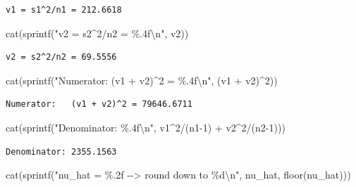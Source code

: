 \documentclass[
  letterpaper,
  DIV=11,
  numbers=noendperiod]{scrartcl}
\newenvironment{Shaded}{\begin{snugshade}}{\end{snugshade}}
\newcommand{\DecValTok}[1]{\textcolor[rgb]{0.68,0.00,0.00}{#1}}
\newcommand{\FunctionTok}[1]{\textcolor[rgb]{0.28,0.35,0.67}{#1}}
\newcommand{\NormalTok}[1]{\textcolor[rgb]{0.00,0.23,0.31}{#1}}
\newcommand{\SpecialCharTok}[1]{\textcolor[rgb]{0.37,0.37,0.37}{#1}}
\newcommand{\StringTok}[1]{\textcolor[rgb]{0.13,0.47,0.30}{#1}}
\begin{document}
\begin{verbatim}
v1 = s1^2/n1 = 212.6618
\end{verbatim}

\begin{Shaded}
\begin{Highlighting}[]
\FunctionTok{cat}\NormalTok{(}\FunctionTok{sprintf}\NormalTok{(}\StringTok{"v2 = s2\^{}2/n2 = \%.4f}\SpecialCharTok{\textbackslash{}n}\StringTok{"}\NormalTok{, v2))}
\end{Highlighting}
\end{Shaded}

\begin{verbatim}
v2 = s2^2/n2 = 69.5556
\end{verbatim}

\begin{Shaded}
\begin{Highlighting}[]
\FunctionTok{cat}\NormalTok{(}\FunctionTok{sprintf}\NormalTok{(}\StringTok{"Numerator:   (v1 + v2)\^{}2 = \%.4f}\SpecialCharTok{\textbackslash{}n}\StringTok{"}\NormalTok{, (v1 }\SpecialCharTok{+}\NormalTok{ v2)}\SpecialCharTok{\^{}}\DecValTok{2}\NormalTok{))}
\end{Highlighting}
\end{Shaded}

\begin{verbatim}
Numerator:   (v1 + v2)^2 = 79646.6711
\end{verbatim}

\begin{Shaded}
\begin{Highlighting}[]
\FunctionTok{cat}\NormalTok{(}\FunctionTok{sprintf}\NormalTok{(}\StringTok{"Denominator: \%.4f}\SpecialCharTok{\textbackslash{}n}\StringTok{"}\NormalTok{, v1}\SpecialCharTok{\^{}}\DecValTok{2}\SpecialCharTok{/}\NormalTok{(n1}\DecValTok{{-}1}\NormalTok{) }\SpecialCharTok{+}\NormalTok{ v2}\SpecialCharTok{\^{}}\DecValTok{2}\SpecialCharTok{/}\NormalTok{(n2}\DecValTok{{-}1}\NormalTok{)))}
\end{Highlighting}
\end{Shaded}

\begin{verbatim}
Denominator: 2355.1563
\end{verbatim}

\begin{Shaded}
\begin{Highlighting}[]
\FunctionTok{cat}\NormalTok{(}\FunctionTok{sprintf}\NormalTok{(}\StringTok{"nu\_hat = \%.2f  {-}{-}\textgreater{}  round down to \%d}\SpecialCharTok{\textbackslash{}n}\StringTok{"}\NormalTok{, nu\_hat, }\FunctionTok{floor}\NormalTok{(nu\_hat)))}
\end{Highlighting}
\end{Shaded}
\end{document}
